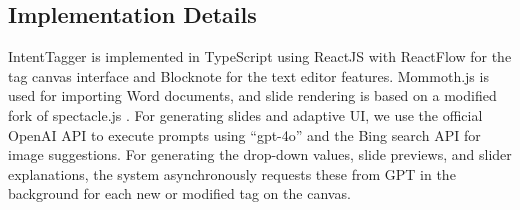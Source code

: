 \subsection{Implementation Details}

IntentTagger is implemented in TypeScript using ReactJS \cite{react.js_reactjs_2024} with ReactFlow \cite{reactflow_react_2024} for the tag canvas interface and Blocknote \cite{blocknote_blocknote_2024} for the text editor features. 
Mommoth.js \cite{williamson_mwilliamson_2024} is used for importing Word documents, and slide rendering is based on a modified fork of spectacle.js \cite{formidablelabs_formidablelabs_2024}. 
For generating slides and adaptive UI, we use the official OpenAI API \cite{openai_openai_2024} to execute prompts using “gpt-4o” and the Bing search API \cite{microsoft_bing_2024} for image suggestions.
For generating the drop-down values, slide previews, and slider explanations, the system asynchronously requests these from GPT in the background for each new or modified tag on the canvas.









